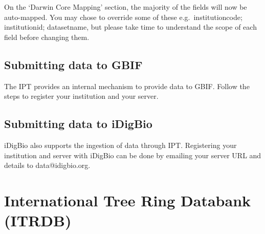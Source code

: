 On the `Darwin Core Mapping' section, the majority of the fields will now be auto-mapped.  You may chose to override some of these e.g.\ institutioncode; institutionid; datasetname, but please take time to understand the scope of each field before changing them.  

\subsection{Submitting data to GBIF}
The IPT provides an internal mechanism to provide data to GBIF.  Follow the steps to register your institution and your server.

\subsection{Submitting data to iDigBio}
iDigBio also supports the ingestion of data through IPT.  Registering your institution and server with iDigBio can be done by emailing your server URL and details to data@idigbio.org.

\section{International Tree Ring Databank (ITRDB)}












